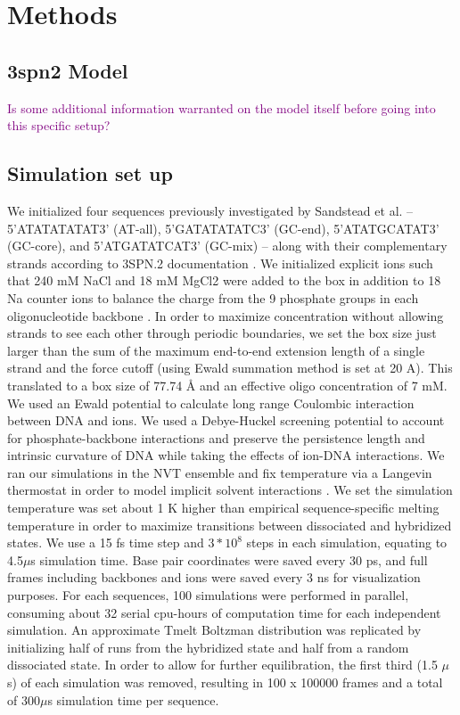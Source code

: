 \documentclass[journal=jpcbfk,manuscript=article]{achemso}
\begin{document}
\section{\label{sec:methods}Methods}

\subsection{\label{sec:methods}3spn2 Model}

\textcolor{purple}{Is some additional information warranted on the model itself before going into this specific setup?}

\subsection{\label{sec:methods}Simulation set up}

We initialized four sequences previously investigated by Sandstead et al. -- 5'ATATATATAT3' (AT-all), 5'GATATATATC3' (GC-end), 5'ATATGCATAT3' (GC-core), and 5'ATGATATCAT3' (GC-mix) -- along with their complementary strands according to 3SPN.2 documentation \citep{Sanstead2016, Phys2014}. We initialized explicit ions such that 240 mM NaCl and 18 mM MgCl2 were added to the box in addition to 18 Na counter ions to balance the charge from the 9 phosphate groups in each oligonucleotide backbone \citep{Hinckley2015}. In order to maximize concentration without allowing strands to see each other through periodic boundaries, we set the box size just larger than the sum of the maximum end-to-end extension length of a single strand and the force cutoff (using Ewald summation method is set at 20 A). This translated to a box size of 77.74 Å and an effective oligo concentration of 7 mM. We used an Ewald potential to calculate long range Coulombic interaction between DNA and ions. We used a Debye-Huckel screening potential to account for phosphate-backbone interactions and preserve the persistence length and intrinsic curvature of DNA while taking the effects of ion-DNA interactions\citep{Hinckley2015}. We ran our simulations in the NVT ensemble and fix temperature via a Langevin thermostat in order to model implicit solvent interactions \citep{Schneider1978Molecular-dynamicsTransitions}. We set the simulation temperature was set about 1 K higher than empirical sequence-specific melting temperature in order to maximize transitions between dissociated and hybridized states. We use a 15 fs time step and $3*10^{8}$ steps in each simulation, equating to 4.5$\mu$s simulation time. Base pair coordinates were saved every 30 ps, and full frames including backbones and ions were saved every 3 ns for visualization purposes. For each sequences, 100 simulations were performed in parallel, consuming about 32 serial cpu-hours of computation time for each independent simulation. An approximate Tmelt Boltzman distribution was replicated by initializing half of runs from the hybridized state and half from a random dissociated state. In order to allow for further equilibration, the first third (1.5 $\mu$s) of each simulation was removed, resulting in 100 x 100000 frames and a total of 300$\mu$s simulation time per sequence.
\end{document}

